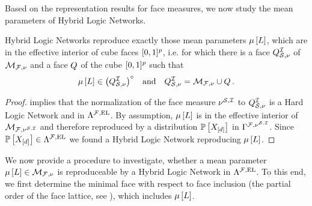 Based on the representation results for face measures, we now study the mean parameters of Hybrid Logic Networks.

\begin{theorem}\label{the:hlnInteriorCharacterization}
    Hybrid Logic Networks reproduce exactly those mean parameters $\mu\left[L\right]$, which are in the effective interior of cube faces $[0,1]^{p}$, i.e. for which there is a face $Q^{\mathcal{I}}_{\mathcal{S},\nu}$ of $\mathcal{M}_{\mathcal{F},\nu}$ and a face $Q$ of the cube $[0,1]^{p}$ such that
    \begin{align*}
        \mu\left[L\right]\in{\left(Q^{\mathcal{I}}_{\mathcal{S},\nu}\right)}^{\circ} \quad\text{and}\quad Q^{\mathcal{I}}_{\mathcal{S},\nu} = \mathcal{M}_{\mathcal{F},\nu}\cup Q \, .
    \end{align*}
\end{theorem}
\begin{proof}
     implies that the normalization of the face measure $\nu^{\mathcal{S},\mathcal{I}}$ to $Q^{\mathcal{I}}_{\mathcal{S},\nu}$ is a Hard Logic Network and in $\Lambda^{\mathcal{F},\mathrm{EL}}$.
    By assumption, $\mu\left[L\right]$ is in the effective interior of $\mathcal{M}_{\mathcal{F},\nu^{\mathcal{S},\mathcal{I}}}$ and therefore reproduced by a distribution $\mathbb{P}\left[X_{[d]}\right]$ in $\Gamma^{\mathcal{F},\nu^{\mathcal{S},\mathcal{I}}}$.
    Since $\mathbb{P}\left[X_{[d]}\right]\in\Lambda^{\mathcal{F},\mathrm{EL}}$ we found a Hybrid Logic Network reproducing $\mu\left[L\right]$.
\end{proof}

We now provide a procedure to investigate, whether a mean parameter $\mu\left[L\right]\in\mathcal{M}_{\mathcal{F},\nu}$ is reproduceable by a Hybrid Logic Network in $\Lambda^{\mathcal{F},\mathrm{EL}}$.
To this end, we first determine the minimal face with respect to face inclusion (the partial order of the face lattice, see \cite{ziegler_lectures_2013}), which includes $\mu\left[L\right]$.

